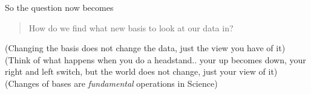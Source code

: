 \documentclass[aspectratio=169]{beamer}\usepackage[]{graphicx}\usepackage[]{xcolor}
\begin{document}
\begin{frame}
So the question now becomes
\begin{quote}
How do we find what new basis to look at our data in?
\end{quote}
\vfill
(Changing the basis does not change the data, just the view you have of it)
\vfill
(Think of what happens when you do a headstand.. your up becomes down, your right and left switch, but the world does not change, just your view of it)
\vfill
(Changes of bases are \emph{fundamental} operations in Science)
\end{frame}







\end{document}
